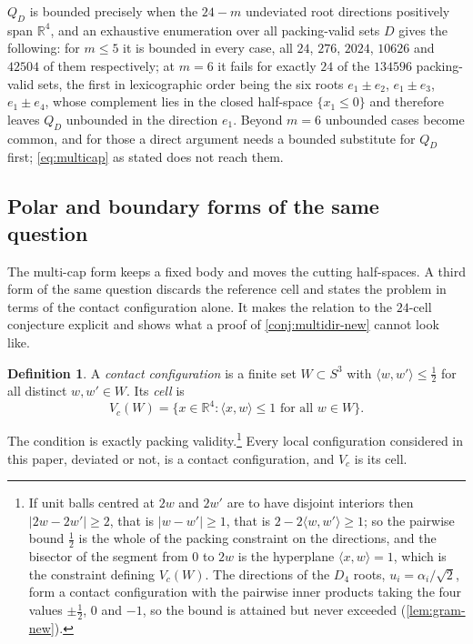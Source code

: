 \documentclass[11pt,reqno]{amsart}
\renewcommand{\_}{\origunderscore\allowbreak}
\numberwithin{equation}{section}
\theoremstyle{plain}
\theoremstyle{definition}
\newtheorem{definition}[thm]{Definition}
\theoremstyle{remark}
\newcommand{\base}{u}                        %
\begin{document}
$Q_D$ is bounded precisely when the $24-m$ undeviated root directions positively
span $\mathbb{R}^4$, and an exhaustive enumeration over all
packing-valid sets $D$ gives the following: for $m\le5$ it is bounded in
every case, all $24$, $276$, $2024$, $10626$ and $42504$ of them
respectively; at $m=6$ it fails for exactly $24$ of the $134596$
packing-valid sets, the first in lexicographic order being the six roots
$e_1\pm e_2$, $e_1\pm e_3$, $e_1\pm e_4$, whose complement lies in the
closed half-space $\{x_1\le0\}$ and therefore leaves $Q_D$ unbounded in
the direction $e_1$. Beyond $m=6$ unbounded cases become common, and for
those a direct argument needs a bounded substitute for $Q_D$ first;
\eqref{eq:multicap} as stated does not reach them.

\subsection{Polar and boundary forms of the same question}\label{sec:polar-surface}

The multi-cap form keeps a fixed body and moves the cutting half-spaces.
A third form of the same question discards the reference cell and states
the problem in terms of the contact configuration alone. It makes the
relation to the $24$-cell conjecture explicit and shows what a proof of
\cref{conj:multidir-new} cannot look like.

\begin{definition}\label{def:contact-config}
A \emph{contact configuration} is a finite set $W\subset S^3$ with
$\langle w,w'\rangle\le\tfrac12$ for all distinct $w,w'\in W$. Its
\emph{cell} is
\[
  V_c(W)=\bigl\{x\in\mathbb{R}^4:\langle x,w\rangle\le1
  \text{ for all }w\in W\bigr\}.
\]
\end{definition}

The condition is exactly packing validity.\footnote{If unit balls
centred at $2w$ and $2w'$ are to have disjoint interiors then
$|2w-2w'|\ge2$, that is $|w-w'|\ge1$, that is
$2-2\langle w,w'\rangle\ge1$; so the pairwise bound $\tfrac12$ is the
whole of the packing constraint on the directions, and the bisector of
the segment from $0$ to $2w$ is the hyperplane $\langle x,w\rangle=1$,
which is the constraint defining $V_c(W)$. The directions of the $D_4$
roots, $\base_i=\alpha_i/\sqrt2$, form a contact configuration with the
pairwise inner products taking the four values $\pm\tfrac12$, $0$ and
$-1$, so the bound is attained but never exceeded
(\cref{lem:gram-new}).} Every local configuration
considered in this paper, deviated or not, is a contact configuration,
and $V_c$ is its cell.
\end{document}
